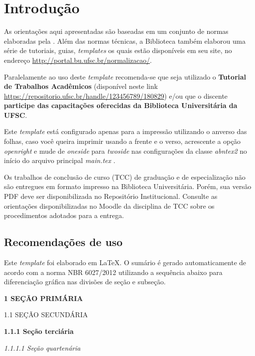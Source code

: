 \chapter{Introdução}

As orientações aqui apresentadas são baseadas em um conjunto de normas elaboradas pela . Além das normas técnicas, a Biblioteca também elaborou uma série de tutoriais, guias, \textit{templates} os quais estão disponíveis em seu site, no endereço \url{http://portal.bu.ufsc.br/normalizacao/}.

Paralelamente ao uso deste \textit{template} recomenda-se que seja utilizado o \textbf{Tutorial de Trabalhos Acadêmicos} (disponível neste link \url{https://repositorio.ufsc.br/handle/123456789/180829}) e/ou que o discente \textbf{participe das capacitações oferecidas da Biblioteca Universitária da UFSC}.

Este \textit{template} está configurado apenas para a impressão utilizando o anverso das folhas, caso você queira imprimir usando a frente e o verso, acrescente a opção \textit{openright} e mude de \textit{oneside} para \textit{twoside} nas configurações da classe \textit{abntex2} no início do arquivo principal \textit{main.tex} \cite{abntex2classe}.

Os trabalhos de conclusão de curso (TCC) de graduação e de especialização não são entregues em formato impresso na Biblioteca Universitária. Porém, sua versão PDF deve ser disponibilizada no Repositório Institucional. Consulte as orientações disponibilizadas no Moodle da disciplina de TCC sobre os procedimentos adotados para a entrega.

\section{Recomendações de uso}
Este \textit{template} foi elaborado em \LaTeX. O sumário é gerado automaticamente de acordo com a norma NBR 6027/2012 utilizando a sequência abaixo para diferenciação gráfica nas divisões de seção e subseção.

\vspace{12pt}

\textbf{1 SEÇÃO PRIMÁRIA}


1.1 SEÇÃO SECUNDÁRIA

\textbf{1.1.1 Seção terciária}

\textit{1.1.1.1 Seção quartenária}

